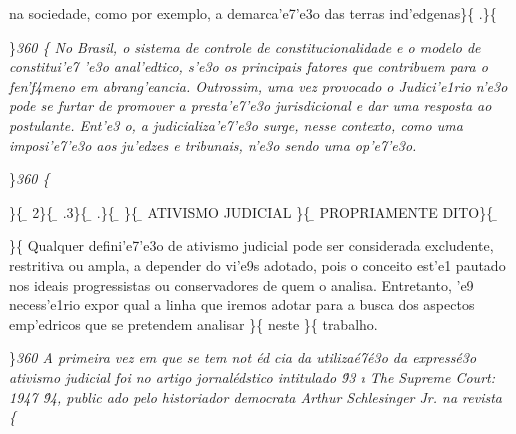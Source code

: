 na sociedade, como por exemplo, a demarca'e7'e3o das terras
ind'edgenas\}\{\rtlch{}  \ltrch{} 
.\}\{\rtlch{}  \ltrch{} \\
\par \}\pard \ltrpar\qj {}\sl360\widctlpar\wrapdefault\faauto{} \{\rtlch{}
 \ltrch{}  No Brasil, o sistema
de controle de constitucionalidade e o modelo de constitui'e7 'e3o
anal'edtico, s'e3o os principais fatores que contribuem para o
fen'f4meno em abrang'eancia. Outrossim, uma vez provocado o Judici'e1rio
n'e3o pode se furtar de promover a presta'e7'e3o jurisdicional e dar uma
resposta ao postulante. Ent'e3 o, a judicializa'e7'e3o surge, nesse
contexto, como uma imposi'e7'e3o aos ju'edzes e tribunais, n'e3o sendo
uma op'e7'e3o.\\
\par \}\pard \ltrpar\qj {}\sl360\widctlpar\wrapdefault\faauto{} \{\rtlch{}
 \ltrch{}  \par \}\{\rtlch{} \ab{}
\ltrch{} \b{} 2\}\{\rtlch{}
\ab{} \ltrch{} \b{} .3\}\{\rtlch{}
\ab{} \ltrch{} \b{} .\}\{\rtlch{}
\ab{} \ltrch{} \b{} \}\{\rtlch{}
\ab{} \ltrch{} \b{}
ATIVISMO JUDICIAL \}\{\rtlch{} \ab{} \ltrch{}
\b{} PROPRIAMENTE DITO\}\{\rtlch{}
\ab{} \ltrch{} \b{}
\par \}\{\rtlch{}  \ltrch{} 
\tab Qualquer defini'e7'e3o de ativismo judicial pode ser considerada
excludente, restritiva ou ampla, a depender do vi'e9s adotado, pois o
conceito est'e1 pautado nos ideais progressistas ou conservadores de
quem o analisa. Entretanto, 'e9 necess'e1rio expor qual a linha que
iremos adotar para a busca dos aspectos emp'edricos que se pretendem
analisar \}\{\rtlch{}  \ltrch{}  neste
\}\{\rtlch{}  \ltrch{} 
trabalho.
\par \}\pard \ltrpar\qj {}\sl360\widctlpar\wrapdefault\faauto{} {\rtlch{}  \ltrch{}  \tab }{\rtlch{}  \ltrch{}  
A primeira vez em que se tem not}{\rtlch{}  \ltrch{}  \'ed}{\rtlch{}  \ltrch{}  cia da utiliza\'e7\'e3o da express\'e3o ativismo judicial foi no artigo jornal\'edstico intitulado \'93}{
\rtlch{} \ai{} \ltrch{} \i{} The Supreme Court: 1947}{\rtlch{}  \ltrch{}  \'94, public}{\rtlch{}  \ltrch{}  ado pelo}{\rtlch{}  \ltrch{} 
  historiador democrata Arthur Schlesinger Jr. na revista }\{\rtlch{}
